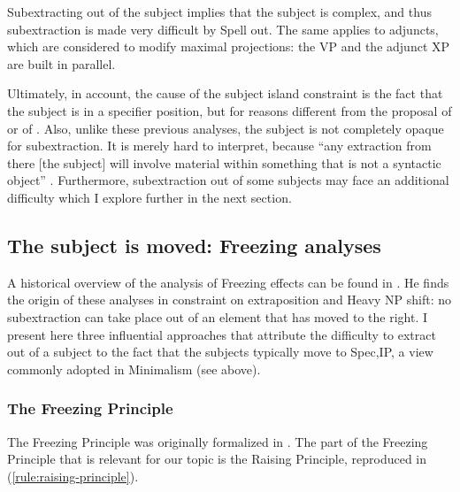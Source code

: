 Subextracting out of the subject implies that the subject is complex, and thus subextraction is made very difficult by Spell out. The same applies to adjuncts, which are considered to modify maximal projections: the VP and the adjunct XP are built in parallel. 

Ultimately, in  account, the cause of the subject island constraint is the fact that the subject is in a specifier position, but for reasons different from the proposal of \citet{Kayne.1983} or of \citet{Chomsky.2008}. Also, unlike these previous analyses, the subject is not completely opaque for subextraction. It is merely hard to interpret, because ``any extraction from there [the subject] will involve material within something that is not a syntactic object'' \citep[92--93]{Uriagereka.2012}. Furthermore, subextraction out of some subjects may face an additional difficulty which I explore further in the next section.



\subsection{The subject is moved: Freezing analyses}

A historical overview of the analysis of Freezing effects can be found in \citet{Corver.2006}. He finds the origin of these analyses in  constraint on extraposition  and Heavy NP shift: no subextraction can take place out of an element that has moved to the right. I present here three influential approaches that attribute the difficulty to extract out of a subject to the fact that the subjects typically move to Spec,IP, a view commonly adopted in Minimalism (see above). 

\subsubsection{The  Freezing  Principle}

The Freezing Principle was originally formalized in \citet{Wexler.1980}. The part of the Freezing Principle that is relevant for our topic is the Raising Principle, reproduced in (\ref{rule:raising-principle}).

